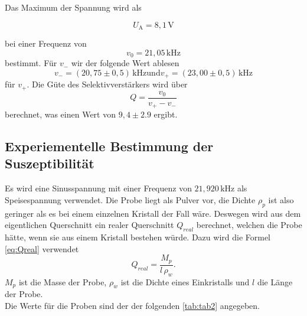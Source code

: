 Das Maximum der Spannung wird als

\begin{equation*}
    U_\text{A} = 8,1 \, \unit{\volt}
\end{equation*}

bei einer Frequenz von 
\begin{equation*}
    v_0 = 21,05 \, \unit{\kilo\hertz}
\end{equation*}
bestimmt.
Für $ v_{-} $ wir der folgende Wert ablesen
\begin{equation*}
  v_{-} = \left( 20,75 \pm 0,5 \right)\, \unit{\kilo\hertz} \text{und}
  v_{+} = \left( 23,00 \pm 0,5 \right)\, \unit{\kilo\hertz}
\end{equation*}
für $v_{+}$.
Die Güte des Selektivverstärkers wird über
\begin{equation}
  Q = \frac{v_0}{v_{+}-v_{-}}
  \label{eq:guete}
\end{equation}
berechnet, was einen Wert von $ 9,4 \pm 2.9 $ ergibt.





\subsection{Experiementelle Bestimmung der Suszeptibilität}

Es wird eine Sinusspannung mit einer Frequenz von $ 21,920 \, \unit{\kilo\hertz}$ als Speisespannung verwendet.
Die Probe liegt als Pulver vor, die Dichte $ \rho_p$ ist also geringer als es bei einem einzelnen Kristall der Fall wäre.
Deswegen wird aus dem eigentlichen Querschnitt ein realer Querschnitt $Q_{real} $ berechnet, welchen die Probe hätte, wenn sie aus einem Kristall bestehen würde.
Dazu wird die Formel \eqref{eq:Qreal} verwendet
\begin{equation}
    Q_{real} = \frac{M_p}{l \, \rho_w} .
    \label{eq:Qreal}
\end{equation}
$M_p$ ist die Masse der Probe, $\rho_w$ ist die Dichte eines Einkristalls und $l$ die Länge der Probe. \\

Die Werte für die Proben sind der der folgenden \autoref{tab:tab2} angegeben.


